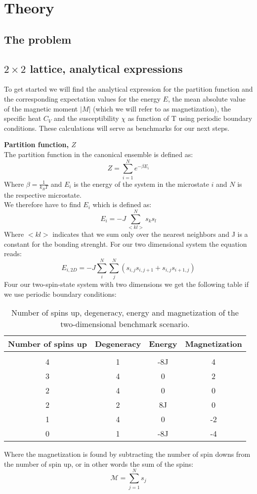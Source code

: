 \documentclass[../main.tex]{subfiles}
\begin{document}
  \section{Theory}
  \subsection{The problem}
  \subsection{$2 \times 2$ lattice, analytical expressions}
    To get started we will find the analytical expression for the partition function and the corresponding expectation values for the energy $E$, the mean absolute value of the magnetic moment $|M|$ (which we will refer to as magnetization), the specific heat $C_V$ and the susceptibility $\chi$ as function of T using periodic boundary conditions. These calculations will serve as benchmarks for our next steps.

    \textbf{Partition function, $Z$}\\
    The partition function in the canonical ensemble is defined as:
    \[ Z = \sum_{i=1}^N e^{-\beta E_i}\]
    Where $\beta =\frac{1}{k_B T}$ and $E_i$ is the energy of the system in the microstate $i$ and $N$ is the respective microstate.
    \\
    We therefore have to find $E_i$ which is defined as:
    \[E_i = -J \sum_{<kl>}^N s_k s_l\]
    Where $<kl>$ indicates that we sum only over the nearest neighbors and J is a constant for the bonding strenght. For our two dimensional system the equation reads:
    \[E_{i,2D} = -J \sum_i^N \sum_j^N \left(s_{i,j}s_{i,j+1} + s_{i,j}s_{i+1,j}\right)\]
    Four our two-spin-state system with two dimensions we get the following table if we use periodic boundary conditions:
    \begin{table}[!h]
      \begin{tabular}{c c c c}
        Number of spins up & Degeneracy & Energy & Magnetization\\
        \hline\\
        4 & 1 & -8J & 4\\
        3 & 4 & 0 & 2 \\
        2 & 4 & 0 & 0\\
        2 & 2 & 8J & 0 \\
        1 & 4 & 0 & -2 \\
        0 & 1 & -8J & -4
      \end{tabular}
      \caption{Number of spins up, degeneracy, energy and magnetization of the two-dimensional benchmark scenario.}
    \end{table}
    \FloatBarrier
    Where the magnetization is found by subtracting the number of spin downs from the number of spin up, or in other words the sum of the spins:
    \[\mathcal{M} = \sum_{j=1}^N s_j\]
\end{document}
